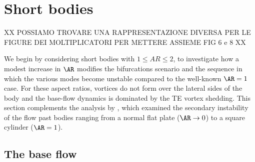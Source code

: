 \section{Short bodies}
\label{sec:short}

XX POSSIAMO TROVARE UNA RAPPRESENTAZIONE DIVERSA PER LE FIGURE DEI MOLTIPLICATORI PER METTERE ASSIEME FIG 6 e 8 XX

We begin by considering short bodies with $1 \le AR \le 2$, to investigate how a modest increase in $\AR$ modifies the bifurcations scenario and the sequence in which the various modes become unstable compared to the well-known $\AR=1$ case. For these aspect ratios, vortices do not form over the lateral sides of the body and the base-flow dynamics is dominated by the TE vortex shedding. This section complements the analysis by \cite{choi-yang-2014}, which examined the secondary instability of the flow past bodies ranging from a normal flat plate ($\AR \rightarrow 0$) to a square cylinder ($\AR=1$).

\subsection{The base flow}


